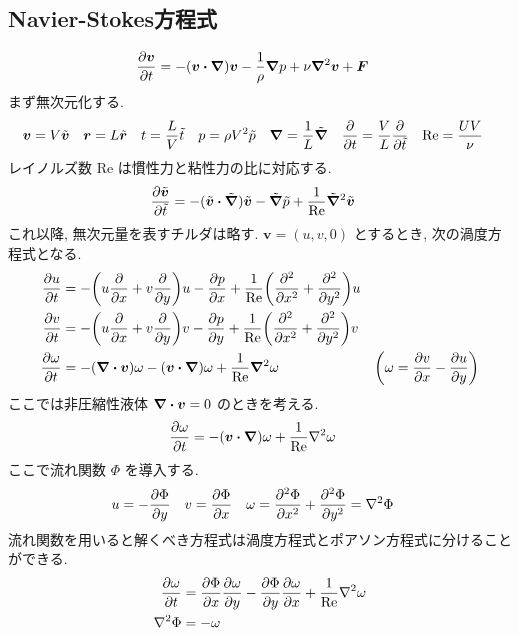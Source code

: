 \documentclass[a4paper,dvipdfmx]{jsarticle}
\theoremstyle{definition}
\begin{document}
\subsection{Navier-Stokes方程式}
\begin{align}
  \pdv{\bm{v}}{t} & = -(\bm{v}\vdot\vnabla)\bm{v} - \frac{1}{\rho}\vnabla p + \nu\vnabla^2\bm{v} + \bm{F}
\end{align}
まず無次元化する.
\begin{align}
  \bm{v} & = V\tilde{\bm{v}} & \bm{r} & = L\tilde{\bm{r}} & t & = \frac{L}{V}\tilde{t} & p & = \rho V^2\tilde{p} & \vnabla & = \frac{1}{L}\tilde{\vnabla} & \pdv{t} & = \frac{V}{L}\pdv{\tilde{t}} & \mathrm{Re} & = \frac{UV}{\nu}
\end{align}
レイノルズ数 $\mathrm{Re}$ は慣性力と粘性力の比に対応する.
\begin{align}
  \pdv{\tilde{\bm{v}}}{\tilde{t}} & = -(\tilde{\bm{v}}\vdot\tilde{\vnabla})\tilde{\bm{v}} - \tilde{\vnabla}\tilde{p} + \frac{1}{\mathrm{Re}}\tilde{\vnabla}^2\tilde{\bm{v}}
\end{align}
これ以降, 無次元量を表すチルダは略す. $\bm{v} = (u, v, 0)$ とするとき, 次の渦度方程式となる.
\begin{align}
  \pdv{u}{t}      & = - \qty(u\pdv{x} + v\pdv{y})u - \pdv{p}{x} + \frac{1}{\mathrm{Re}}\qty(\pdv[2]{x} + \pdv[2]{y})u                                          \\
  \pdv{v}{t}      & = - \qty(u\pdv{x} + v\pdv{y})v - \pdv{p}{y} + \frac{1}{\mathrm{Re}}\qty(\pdv[2]{x} + \pdv[2]{y})v                                          \\
  \pdv{\omega}{t} & = -(\vnabla\vdot\bm{v})\omega - (\bm{v}\vdot\vnabla)\omega + \frac{1}{\mathrm{Re}}\vnabla^2\omega & \qty(\omega = \pdv{v}{x} - \pdv{u}{y})
\end{align}
ここでは非圧縮性液体 $\vnabla\vdot\bm{v} = 0$ のときを考える.
\begin{align}
  \pdv{\omega}{t} & = - (\bm{v}\vdot\vnabla)\omega + \frac{1}{\mathrm{Re}}\laplacian\omega
\end{align}
ここで流れ関数 $\Phi$ を導入する.
\begin{align}
  u & = - \pdv{\Phi}{y} \quad v = \pdv{\Phi}{x} \quad \omega = \pdv[2]{\Phi}{x} + \pdv[2]{\Phi}{y} = \laplacian\Phi
\end{align}
流れ関数を用いると解くべき方程式は渦度方程式とポアソン方程式に分けることができる.
\begin{align}
  \pdv{\omega}{t} & = \pdv{\Phi}{x}\pdv{\omega}{y} - \pdv{\Phi}{y}\pdv{\omega}{x} + \frac{1}{\mathrm{Re}}\laplacian\omega \\
  \laplacian\Phi  & = - \omega
\end{align}
\end{document}
